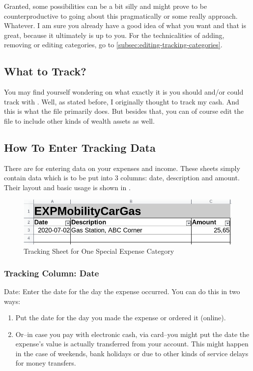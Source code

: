 Granted, some possibilities can be a bit silly and might prove to be counterproductive to going about this pragmatically or some really approach.
Whatever.
I am sure you already have a good idea of what you want and that is great, because it ultimately is up to you.
For the technicalities of adding, removing or editing categories, go to \autoref{subsec:editing-tracking-categories}.

\subsection{What to Track?}
\label{subsec:what-to-track}

You may find yourself wondering on what exactly it is you should and/or could track with \tfn.
Well, as stated before, I originally thought to track my cash.
And this is what the file primarily does.
But besides that, you can of course edit the file to include other kinds of wealth assets as well.

\subsection{How To Enter Tracking Data}
\label{subsec:enter-tracking-data}

There are  for entering data on your expenses and income.
These sheets simply contain data which is to be put into 3 columns: date, description and amount.
Their layout and basic usage is shown in .

\begin{figure}[htp]
	\centering
	\includegraphics[width=0.8\linewidth]{Gfx/EXP-in-one-sheet-moblity-car-gas}
	\caption{Tracking Sheet for One Special Expense Category}
	\label{fig:expenses-data-entry-in-sheet-moblity-car-gas}
\end{figure}

\subsubsection{Tracking Column: Date}
\label{subsec:tracking-column-date}

Date: Enter the date for the day the expense occurred.
You can do this in two ways:
\begin{enumerate}
	\item Put the date for the day you made the expense or ordered it (online).
	\item Or--in case you pay with electronic cash, \eg via card--you might put the date the expense's value is actually transferred from your account.
	This might happen in the case of weekends, bank holidays or due to other kinds of service delays for money transfers.
\end{enumerate}

